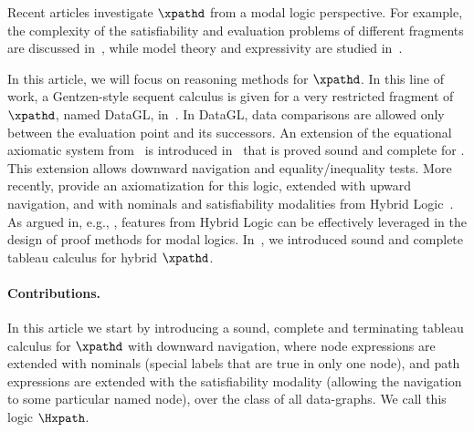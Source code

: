 Recent articles investigate $\xpathd$ from a modal logic perspective.  
For example, the complexity of the satisfiability and evaluation problems of different fragments are discussed
in~\cite{FigPhD,FigueiraS11,Figueira12ACM,Fig13}, while model theory and
expressivity are studied
in~\cite{ADF14,ICDT14,ICDT14Jair,ADF14journal,KR16,GonzalezA21}.  

In this article, we will focus on reasoning methods for $\xpathd$. 
In this line of work, a Gentzen-style sequent calculus is given for a
very restricted fragment of $\xpathd$, named DataGL, in~\cite{BaeldeLS15}. In DataGL, data
comparisons are allowed only between the evaluation point and its
successors. An extension of the equational axiomatic system
from~\cite{cateLM10} is introduced in~\cite{ADFF16report} that is proved sound and complete for \xpathd. This extension allows
downward navigation and equality/inequality tests.
More recently, \cite{ArecF:hilb16,ArecesF21} provide an axiomatization for this logic,
extended with upward navigation, and with nominals and satisfiability
modalities from Hybrid Logic~\cite{arec:hybr05b}. As argued in, e.g., \cite{Brauner07}, features from Hybrid Logic can be effectively leveraged in the design of proof methods for modal logics.  In~\cite{ArecesFS17},
we introduced sound and complete tableau calculus for hybrid $\xpathd$.


\paragraph{Contributions.}  
In this article we start by introducing a sound, complete and terminating tableau
calculus for $\xpathd$ with downward navigation, where node expressions
are extended with nominals (special labels that are true in only one
node), and path expressions are extended with the satisfiability modality
(allowing the navigation to some particular named node), over the class of all data-graphs. We call this
logic $\Hxpath$. 

